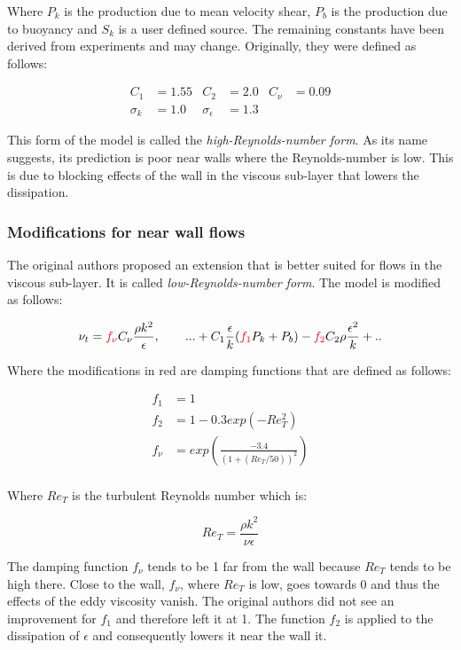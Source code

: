 \noindent Where $P_k$ is the production due to mean velocity shear, $P_b$ is
the production due to buoyancy and $S_k$ is a user defined source. The
remaining constants have been derived from experiments and may change.
Originally, they were defined as follows:

\begin{align*}
    C_1 &= 1.55         & C_2               &= 2.0  & C_{\nu} &= 0.09\\
    \sigma_k &= 1.0     & \sigma_{\epsilon} &= 1.3
\end{align*}

\noindent This form of the model is called the \textit{high-Reynolds-number
form}. As its name suggests, its prediction is poor near walls where the
Reynolds-number is low. This is due to blocking effects of the wall in the
viscous sub-layer that lowers the dissipation. 


\subsubsection{Modifications for near wall flows}
The original authors proposed an extension that is better suited for flows in
the viscous sub-layer. It is called \textit{low-Reynolds-number form}. The
model is modified as follows:

\begin{align}
    \nu_t = \textcolor{red}{f_{\nu}} C_{\nu} \frac{\rho k^2}{\epsilon},  \qquad
%
    ... + C_1 \frac{\epsilon}{k}(\textcolor{red}{f_1} P_k + P_b) 
    - \textcolor{red}{f_2} C_2 \rho \frac{\epsilon^2}{k} + ..
\end{align}

\noindent Where the modifications in red are damping functions that are defined
as follows:

\begin{align}
    f_1 &= 1 \\
    f_2 &= 1 - 0.3 exp(-Re_T^2) \\
    f_{\nu} &= exp \left( \frac{-3.4}{(1 + (Re_T/50))^2}\right) \\
\end{align}

\noindent Where $Re_T$ is the turbulent Reynolds number which is:

\begin{equation}
    Re_T = \frac{\rho k^2}{\nu \epsilon} 
\end{equation}

\noindent The damping function $f_{\nu}$ tends to be 1 far from the wall
because $Re_T$ tends to be high there. Close to the wall, $f_{\nu}$, where
$Re_T$ is low, goes towards 0 and thus the effects of the eddy viscosity
vanish. The original authors did not see an improvement for $f_1$ and therefore
left it at 1. The function $f_2$ is applied to the dissipation of $\epsilon$
and consequently lowers it near the wall it.


